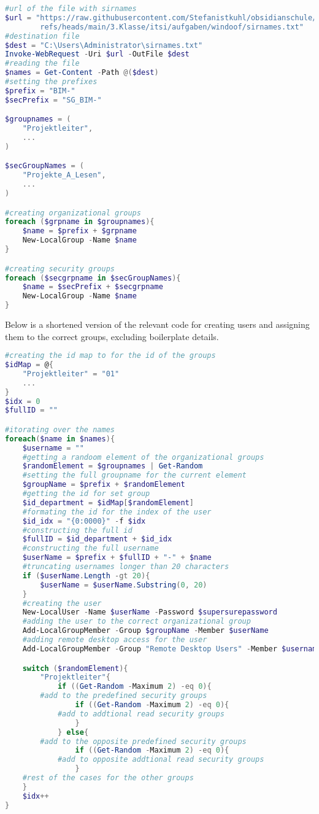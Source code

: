 \documentclass[a4paper]{article}
\begin{document}
\begin{lstlisting}[language=PowerShell]
#url of the file with sirnames
$url = "https://raw.githubusercontent.com/Stefanistkuhl/obsidianschule/
        refs/heads/main/3.Klasse/itsi/aufgaben/windoof/sirnames.txt"
#destination file
$dest = "C:\Users\Administrator\sirnames.txt"
Invoke-WebRequest -Uri $url -OutFile $dest
#reading the file
$names = Get-Content -Path @($dest)
#setting the prefixes
$prefix = "BIM-"
$secPrefix = "SG_BIM-"

$groupnames = (
    "Projektleiter",
    ...
)

$secGroupNames = (
    "Projekte_A_Lesen",
    ...
)

#creating organizational groups
foreach ($grpname in $groupnames){
    $name = $prefix + $grpname
    New-LocalGroup -Name $name
}

#creating security groups
foreach ($secgrpname in $secGroupNames){
    $name = $secPrefix + $secgrpname
    New-LocalGroup -Name $name
}

\end{lstlisting}
\newpage
Below is a shortened version of the relevant code for creating users and assigning them to the correct groups, excluding boilerplate details.
\begin{lstlisting}[language=PowerShell]
#creating the id map to for the id of the groups
$idMap = @{
    "Projektleiter" = "01"
    ...
}
$idx = 0
$fullID = ""

#itorating over the names
foreach($name in $names){
    $username = ""
    #getting a randoom element of the organizational groups
    $randomElement = $groupnames | Get-Random
    #setting the full groupname for the current element
    $groupName = $prefix + $randomElement
    #getting the id for set group
    $id_department = $idMap[$randomElement]
    #formating the id for the index of the user
    $id_idx = "{0:0000}" -f $idx
    #constructing the full id
    $fullID = $id_department + $id_idx
    #constructing the full username
    $userName = $prefix + $fullID + "-" + $name
    #truncating usernames longer than 20 characters
    if ($userName.Length -gt 20){
        $userName = $userName.Substring(0, 20)
    }
    #creating the user
    New-LocalUser -Name $userName -Password $supersurepassword
    #adding the user to the correct organizational group
    Add-LocalGroupMember -Group $groupName -Member $userName
    #adding remote desktop access for the user
    Add-LocalGroupMember -Group "Remote Desktop Users" -Member $username

    switch ($randomElement){
        "Projektleiter"{
            if ((Get-Random -Maximum 2) -eq 0){
		#add to the predefined security groups
                if ((Get-Random -Maximum 2) -eq 0){
			#add to addtional read security groups
                }
            } else{
		#add to the opposite predefined security groups
                if ((Get-Random -Maximum 2) -eq 0){
			#add to opposite addtional read security groups
                }
	#rest of the cases for the other groups
    }
    $idx++
}
\end{lstlisting}
\newpage
\end{document}
